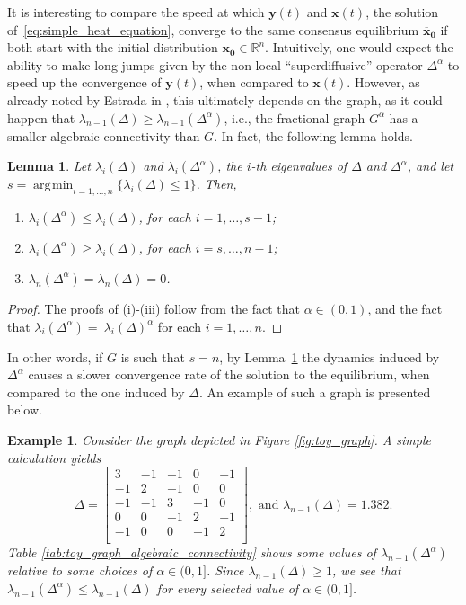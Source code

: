 \documentclass[a4paper,12pt]{article}
\newtheorem{lemma}{Lemma}
\newtheorem{example}{Example}
\DeclareMathOperator*{\argmin}{\arg\!\min}
\newcommand{\R}{\mathbb{R}}
\newcommand{\xvec}{\mathbf{x}}
\newcommand{\yvec}{\mathbf{y}}
\newcommand{\zerovec}{\mathbf{0}}
\newcommand{\consensus}{\overline{\mathbf{x}}_{\mathbf{0}}}
\newcommand{\fL}{\Delta^\alpha}
\newcommand{\fG}{G^\alpha}
\begin{document}
It is interesting to compare the speed at which $\mathbf{y}(t)$ and $\mathbf{x}(t)$, the solution of~\eqref{eq:simple_heat_equation}, converge to the same consensus equilibrium $\consensus$ if both start with the initial distribution $\xvec_{\zerovec}\in\R^{n}$. Intuitively, one would expect the ability to make long-jumps given by the non-local ``superdiffusive'' operator $\fL$ to speed up the convergence of $\yvec(t)$, when compared to $\xvec(t)$. 
However, as already noted by Estrada in \cite{Estrada_2021_fractional_vs_path_laplacians}, this ultimately depends on the graph, as it could happen that $\lambda_{n-1}(\Delta)\geq\lambda_{n-1}(\fL)$, i.e., the fractional graph $\fG$ has a smaller algebraic connectivity than $G$. In fact, the following lemma holds.
\begin{lemma} \label{lemma:eigenvalues_of_L_and_fL}
    Let $\lambda_i(\Delta)$ and $\lambda_i(\fL)$, the $i$-th eigenvalues of $\Delta$ and $\fL$, and let $s=\argmin_{i=1,\dots,n}\{\lambda_{i}(\Delta)\leq1\}$. Then,
\begin{enumerate}[label=\normalfont{(\roman*)}]
    \item $\lambda_i(\fL) \leq \lambda_i(\Delta)$, for each  $i=1,\dots,s-1$; 
    \item  $\lambda_i(\fL) \geq \lambda_i(\Delta)$,  for each  $i=s,\dots,n-1$;
    \item $\lambda_n(\fL)=\lambda_n(\Delta)=0$.
\end{enumerate}
\end{lemma}
\begin{proof}
The proofs of (i)-(iii) follow from the fact that $\alpha\in(0,1)$, and the fact that $\lambda_i(\fL)=~\lambda_i(\Delta)^{\alpha}$ for each $i=1,\ldots,n$.
\end{proof}


In other words, if $G$ is such that 
$s=n$, by Lemma~\ref{lemma:eigenvalues_of_L_and_fL} the dynamics induced by $\fL$ causes a slower convergence rate of the solution to the equilibrium, when compared to the one induced by $\Delta$. An example of such a graph is presented below.

\begin{example}\label{example:toy_graph}
Consider the graph depicted in Figure \ref{fig:toy_graph}. A simple calculation yields 
\begin{equation*}
\Delta = 
\begin{bmatrix}
3  & -1 & -1 &  0  & -1 \\
-1 &  2 & -1 &  0  &  0 \\
-1 & -1 &  3 & -1  &  0 \\
0  &  0 & -1 &  2  & -1 \\
-1 &  0 &  0 & -1  &  2 \\
\end{bmatrix},\text{ and }
\lambda_{n-1}(\Delta)=1.382.    
\end{equation*}
Table \ref{tab:toy_graph_algebraic_connectivity} shows some values of $\lambda_{n-1}(\fL)$ relative to some choices of $\alpha\in(0,1]$. Since $\lambda_{n-1}(\Delta)\geq1$, we see that $\lambda_{n-1}(\fL)\leq\lambda_{n-1}(\Delta)$ for every selected value of $\alpha\in(0,1]$. 
\end{example}
\end{document}
